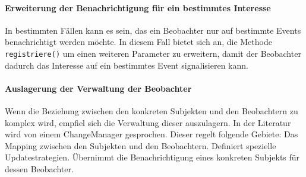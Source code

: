 

\paragraph{Erweiterung der Benachrichtigung für ein bestimmtes Interesse} In bestimmten Fällen kann es sein, das ein Beobachter nur auf bestimmte Events benachrichtigt werden möchte. In diesem Fall bietet sich an,  die Methode \texttt{registriere()} um einen weiteren Parameter zu erweitern, damit der Beobachter dadurch das Interesse auf ein bestimmtes Event signalisieren kann.

\paragraph{Auslagerung der Verwaltung der Beobachter} Wenn die Beziehung zwischen den konkreten Subjekten und den Beobachtern zu komplex wird, empfiel sich die Verwaltung dieser auszulagern. In der Literatur wird von einem ChangeManager gesprochen. Dieser regelt folgende Gebiete: Das Mapping zwischen den Subjekten und den Beobachtern. Definiert spezielle Updatestrategien. Übernimmt die Benachrichtigung eines konkreten Subjekts für dessen Beobachter.



